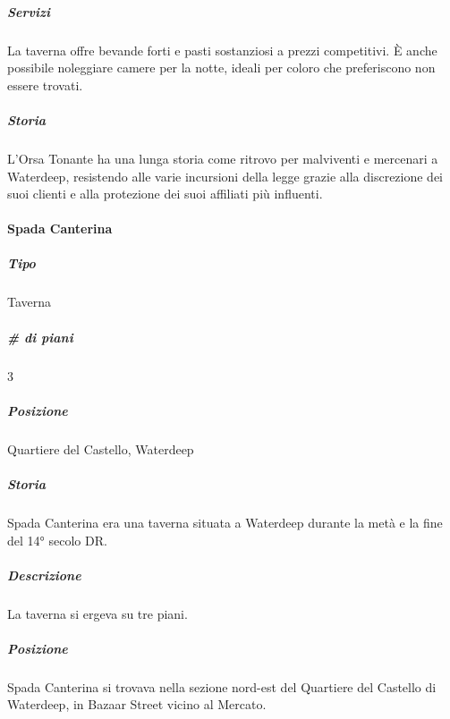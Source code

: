 \documentclass{article}
\begin{document}
\subparagraph{Servizi}
La taverna offre bevande forti e pasti sostanziosi a prezzi competitivi. È anche possibile noleggiare camere per la notte, ideali per coloro che preferiscono non essere trovati.

\subparagraph{Storia}
L'Orsa Tonante ha una lunga storia come ritrovo per malviventi e mercenari a Waterdeep, resistendo alle varie incursioni della legge grazie alla discrezione dei suoi clienti e alla protezione dei suoi affiliati più influenti.



\paragraph{Spada Canterina}

\subparagraph{Tipo}
Taverna

\subparagraph{\# di piani}
3

\subparagraph{Posizione}
Quartiere del Castello, Waterdeep

\subparagraph{Storia}
Spada Canterina era una taverna situata a Waterdeep durante la metà e la fine del 14° secolo DR.

\subparagraph{Descrizione}
La taverna si ergeva su tre piani.

\subparagraph{Posizione}
Spada Canterina si trovava nella sezione nord-est del Quartiere del Castello di Waterdeep, in Bazaar Street vicino al Mercato.



\paragraph{}
\paragraph{}
\paragraph{}
\paragraph{}
\paragraph{}
\paragraph{}
\paragraph{}
\end{document}
